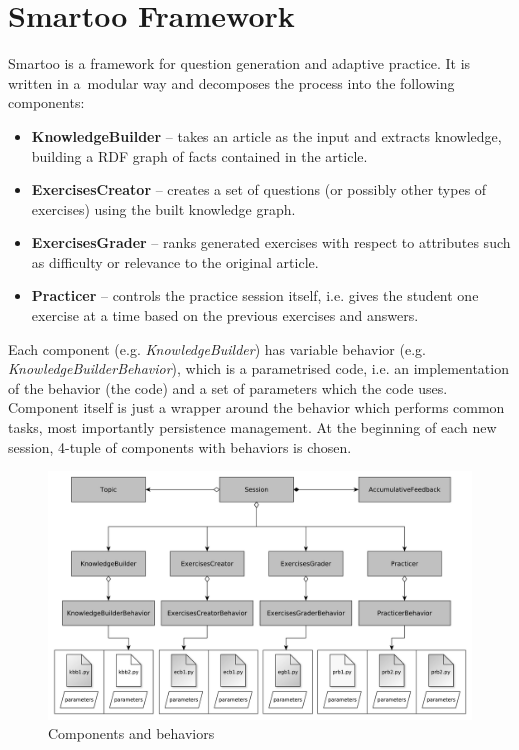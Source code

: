\documentclass[12pt, twoside]{fithesis2}
\renewcommand{\_}{\leavevmode \kern0.07em\vbox{\hrule width0.4em}}
\newcommand{\squarebullet}{\textcolor{black}{\raisebox{0.15em}{\rule{4pt}{4pt}}}}
\newcommand{\emptysquarebullet}{\textcolor{black}{\raisebox{0.10em}{\tiny$\square$}}}
\newenvironment{myItemize}{
  \begin{itemize}[leftmargin=2em,rightmargin=1em,itemsep=\parskip ,parsep=0em,topsep=0em,partopsep=0em]
  \renewcommand{\labelitemi}{\squarebullet}
  \renewcommand{\labelitemii}{\textbullet}
}{
  \end{itemize}
}
\begin{document}
\chapter{Smartoo Framework}
\label{chap:smartoo}

Smartoo is a framework for question generation and adaptive practice.
It is written in a~modular way and decomposes the process into the following components:
\begin{myItemize}
\item \textbf{KnowledgeBuilder} -- takes an article as the input and extracts knowledge, building a RDF graph of facts contained in the article.
\item \textbf{ExercisesCreator} -- creates a set of questions (or possibly other types of exercises) using the built knowledge graph.
\item \textbf{ExercisesGrader} -- ranks generated exercises with respect to attributes such as difficulty or relevance to the original article.
\item \textbf{Practicer} -- controls the practice session itself, i.e. gives the student one exercise at a time based on the previous exercises and answers.
\end{myItemize}
Each component (e.g. \textit{KnowledgeBuilder}) has variable behavior (e.g. \textit{KnowledgeBuilderBehavior}), which is a parametrised code, i.e. an implementation of the behavior (the code) and a set of parameters which the code uses.
Component itself is just a wrapper around the behavior which performs common tasks, most importantly persistence management.
At the beginning of each new session, 4-tuple of components with behaviors is chosen.%

\begin{figure}[h]
  \centering
  \includegraphics[width=\textwidth]{images/architecture.pdf}
  \caption{Components and behaviors}
  \label{fig:smartoo-architecture}
\end{figure}
\end{document}
